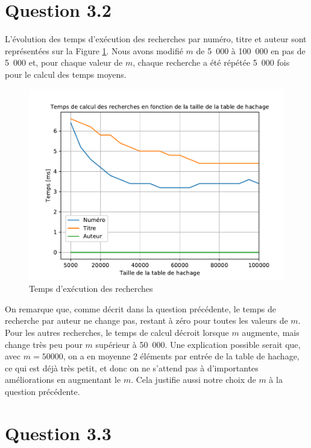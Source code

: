 \documentclass[a4paper,12pt]{article}
\numberwithin{equation}{section}
\begin{document}
\section*{Question 3.2}

L'évolution des temps d'exécution des recherches par numéro, titre et auteur sont représentées sur la Figure \ref{FigQues32}. Nous avons modifié $m$ de 5~000 à 100~000 en pas de 5~000 et, pour chaque valeur de $m$, chaque recherche a été répétée 5~000 fois pour le calcul des temps moyens.

\begin{figure}[ht]
\centering
\includegraphics[scale=0.75]{FigQues3_2}
\caption{Temps d'exécution des recherches}
\label{FigQues32}
\end{figure}

On remarque que, comme décrit dans la question précédente, le temps de recherche par auteur ne change pas, restant à zéro pour toutes les valeurs de $m$. Pour les autres recherches, le temps de calcul décroit lorsque $m$ augmente, mais change très peu pour $m$ supérieur à 50~000. Une explication possible serait que, avec $m = 50 000$, on a en moyenne 2 éléments par entrée de la table de hachage, ce qui est déjà très petit, et donc on ne s'attend pas à d'importantes améliorations en augmentant le $m$. Cela justifie aussi notre choix de $m$ à la question précédente.

\section*{Question 3.3}
\end{document}

